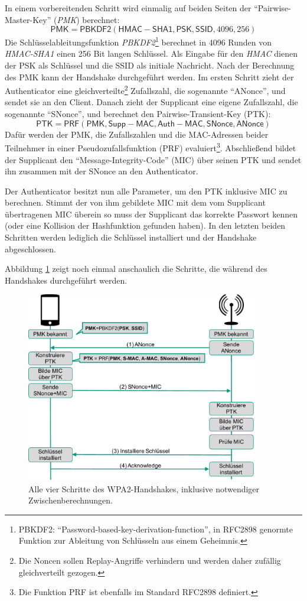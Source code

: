 In einem vorbereitenden Schritt wird einmalig auf beiden Seiten der \enquote{Pairwise-Master-Key} (\textit{PMK}) berechnet:
\[\mathsf{PMK} = \mathsf{PBKDF2}(\mathsf{HMAC-SHA1}, \mathsf{PSK}, \mathsf{SSID}, 4096, 256)\]
Die Schlüsselableitungsfunktion \textit{PBKDF2}\footnote{PBKDF2: \enquote{Password-based-key-derivation-function}, in RFC2898 genormte Funktion zur Ableitung von Schlüsseln aus einem Geheimnis.} berechnet in 4096 Runden von \textit{HMAC-SHA1} einen 256 Bit langen Schlüssel.
Als Eingabe für den \textit{HMAC} dienen der PSK als Schlüssel und die SSID als initiale Nachricht.
Nach der Berechnung des PMK kann der Handshake durchgeführt werden.
Im ersten Schritt zieht der Authenticator eine gleichverteilte\footnote{Die Noncen sollen Replay-Angriffe verhindern und werden daher zufällig gleichverteilt gezogen.} Zufallszahl, die sogenannte \enquote{ANonce}, und sendet sie an den Client.
Danach zieht der Supplicant eine eigene Zufallszahl, die sogenannte \enquote{SNonce}, und berechnet den Pairwise-Transient-Key (PTK):
\[\mathsf{PTK} = \mathsf{PRF}(\mathsf{PMK}, \mathsf{Supp-MAC}, \mathsf{Auth-MAC}, \mathsf{SNonce}, \mathsf{ANonce})\]
Dafür werden der PMK, die Zufallszahlen und die MAC-Adressen beider Teilnehmer in einer Pseudozufallsfunktion (PRF) evaluiert\footnote{Die Funktion PRF ist ebenfalls im Standard RFC2898 definiert.}.
Abschließend bildet der Supplicant den \enquote{Message-Integrity-Code} (MIC) über seinen PTK und sendet ihn zusammen mit der SNonce an den Authenticator.

Der Authenticator besitzt nun alle Parameter, um den PTK inklusive MIC zu berechnen.
Stimmt der von ihm gebildete MIC mit dem vom Supplicant übertragenen MIC überein so muss der Supplicant das korrekte Passwort kennen (oder eine Kollision der Hashfunktion gefunden haben).
In den letzten beiden Schritten werden lediglich die Schlüssel installiert und der Handshake abgeschlossen.

Abbildung \ref{fig:wpa2handshake} zeigt noch einmal anschaulich die Schritte, die während des Handshakes durchgeführt werden.
\begin{figure}[ht]
	\centering
	\includegraphics[width=0.90\textwidth]{graphics/wpa2handshake}
	\caption[WPA2-PSK-Handshake]{Alle vier Schritte des WPA2-Handshakes, inklusive notwendiger Zwischenberechnungen.}
	\label{fig:wpa2handshake}
\end{figure}

\FloatBarrier
